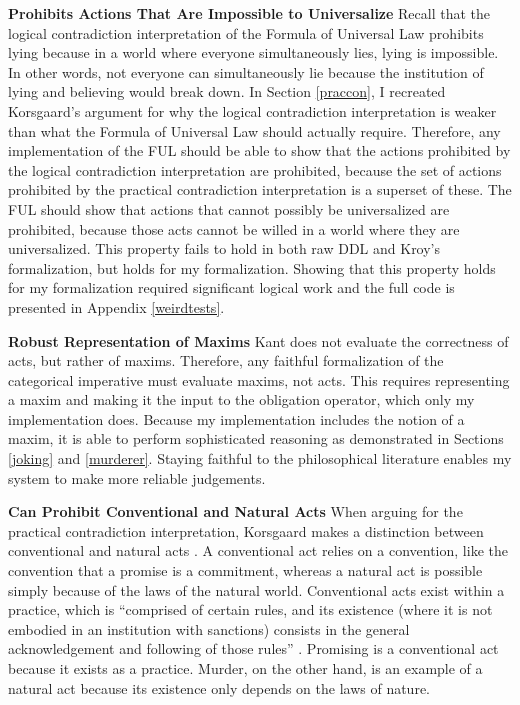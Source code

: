 \begin{isabellebody}
\begin{isamarkuptext}
\noindent \textbf{Prohibits Actions That Are Impossible to Universalize} Recall that 
the logical contradiction interpretation of the Formula of Universal Law prohibits lying because in a world 
where everyone simultaneously lies, lying is impossible. In other words, not everyone can simultaneously
lie because the institution of lying and believing would break down. In Section \ref{praccon}, 
I recreated Korsgaard's argument for why the logical contradiction interpretation is weaker than what the
Formula of Universal Law should actually require. Therefore, any implementation of the FUL should be 
able to show that the actions prohibited by the logical contradiction interpretation are prohibited, 
because the set of actions prohibited by the practical contradiction interpretation is a superset of these.
The FUL should show that actions that cannot possibly be universalized are prohibited, because those acts cannot be willed in 
a world where they are universalized. This property fails to hold in both raw DDL
and Kroy's formalization, but holds for my formalization. Showing that this property holds
for my formalization required significant logical work and the full code is presented in Appendix \ref{weirdtests}.%
\end{isamarkuptext}\isamarkuptrue%
%
\begin{isamarkuptext}%
\noindent \textbf{Robust Representation of Maxims} Kant does not evaluate the correctness of acts, but rather of maxims. Therefore, any 
faithful formalization of the categorical imperative must evaluate maxims, not acts. This requires 
representing a maxim and making it the input to the obligation operator, which only my implementation 
does. Because my implementation includes the notion of a maxim, it is able to perform sophisticated 
reasoning as demonstrated in Sections \ref{joking} and \ref{murderer}. Staying faithful to the philosophical 
literature enables my system to make more reliable judgements.

\medskip%
\end{isamarkuptext}\isamarkuptrue%
%
\begin{isamarkuptext}%
\noindent \textbf{Can Prohibit Conventional and Natural Acts} When arguing for the practical contradiction interpretation,
Korsgaard makes a distinction between conventional and natural acts \citep{KorsgaardFUL}. 
A conventional act relies on a convention, like the 
convention that a promise is a commitment, whereas a natural act is possible simply because of the laws 
of the natural world. Conventional acts exist within a practice, which is ``comprised of certain rules, 
and its existence (where it is not embodied in an institution with sanctions) consists in the general 
acknowledgement and following of those rules'' \cite[10]{KorsgaardFUL}. Promising is a conventional act 
because it exists as a practice. Murder, on the other hand, is an example of a natural act because 
its existence only depends on the laws of nature\cite[11]{KorsgaardFUL}.


\end{isamarkuptext}
\end{isabellebody}
